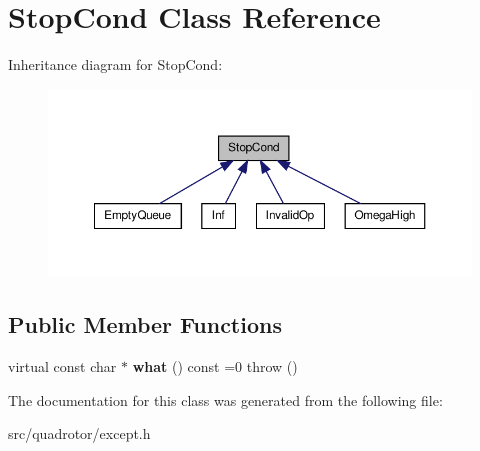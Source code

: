 \hypertarget{classStopCond}{\section{\-Stop\-Cond \-Class \-Reference}
\label{classStopCond}
}


\-Inheritance diagram for \-Stop\-Cond\-:\nopagebreak
\begin{figure}[H]
\begin{center}
\leavevmode
\includegraphics[width=350pt]{classStopCond__inherit__graph}
\end{center}
\end{figure}
\subsection*{\-Public \-Member \-Functions}
\begin{DoxyCompactItemize}
\item 
\hypertarget{classStopCond_aa359d703fac6691cd13f0b8c4df62d68}{virtual const char $\ast$ {\bfseries what} () const =0  throw ()}\label{classStopCond_aa359d703fac6691cd13f0b8c4df62d68}

\end{DoxyCompactItemize}


\-The documentation for this class was generated from the following file\-:\begin{DoxyCompactItemize}
\item 
src/quadrotor/except.\-h\end{DoxyCompactItemize}
